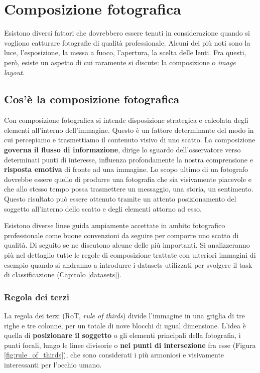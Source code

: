 \chapter{Composizione fotografica}
\label{composizione_fotografica}
Esistono diversi fattori che dovrebbero essere tenuti in considerazione quando si vogliono catturare fotografie di qualità professionale. Alcuni dei più noti sono la luce, l'esposizione, la messa a fuoco, l'apertura, la scelta delle lenti. Fra questi, però, esiste un aspetto di cui raramente si discute: la composizione o \textit{image layout}.

\section{Cos'è la composizione fotografica}

Con composizione fotografica si intende disposizione strategica e calcolata degli elementi all'interno dell'immagine. Questo è un fattore determinante del modo in cui percepiamo e trasmettiamo il contenuto visivo di uno scatto. La composizione \textbf{governa il flusso di informazione}, dirige lo sguardo dell'osservatore verso determinati punti di interesse, influenza profondamente la nostra comprensione e \textbf{risposta emotiva} di fronte ad una immagine. Lo scopo ultimo di un fotografo dovrebbe essere quello di produrre una fotografia che sia visivamente piacevole e che allo stesso tempo possa trasmettere un messaggio, una storia, un sentimento. Questo risultato può essere ottenuto tramite un attento posizionamento del soggetto all'interno dello scatto e degli elementi attorno ad esso. 

Esistono diverse linee guida ampiamente accettate in ambito fotografico professionale come buone convenzioni da seguire per comporre uno scatto di qualità. Di seguito se ne discutono alcune delle più importanti. Si analizzeranno più nel dettaglio tutte le regole di composizione trattate con ulteriori immagini di esempio quando si andranno a introdurre i datasets utilizzati per svolgere il task di classificazione (Capitolo \ref{datasets}). 

\subsection{Regola dei terzi}
\label{rot}
La regola dei terzi (RoT, \textit{rule of thirds}) divide l'immagine in una griglia di tre righe e tre colonne, per un totale di nove blocchi di ugual dimensione. L'idea è quella di \textbf{posizionare il soggetto} o gli elementi principali della fotografia, i punti focali, lungo le linee divisorie o \textbf{nei punti di intersezione} fra esse (Figura \ref{fig:rule_of_thirds}), che sono considerati i più armoniosi e visivamente interessanti per l'occhio umano.

